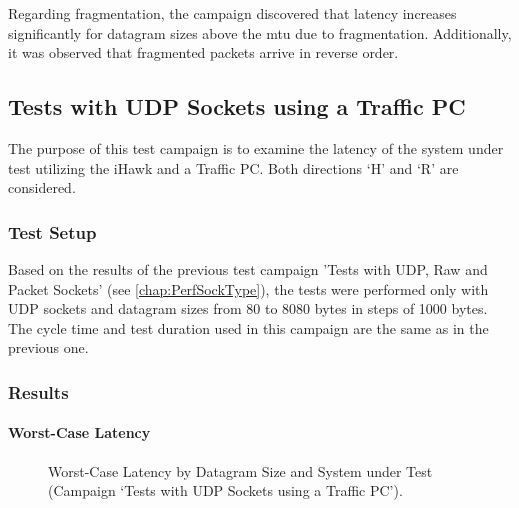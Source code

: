 Regarding fragmentation, the campaign discovered that latency increases significantly for datagram sizes above the \ac{mtu} due to fragmentation. Additionally, it was observed that fragmented packets arrive in reverse order.


\subsection{Tests with UDP Sockets using a Traffic PC}
The purpose of this test campaign is to examine the latency of the system under test utilizing the iHawk and a Traffic PC. Both directions `H' and `R' are considered.

\subsubsection{Test Setup}
Based on the results of the previous test campaign 'Tests with UDP, Raw and Packet Sockets' (see \ref{chap:PerfSockType}), the tests were performed only with UDP sockets and datagram sizes from 80 to 8080 bytes in steps of 1000 bytes. The cycle time and test duration used in this campaign are the same as in the previous one.

\subsubsection{Results}
\paragraph{Worst-Case Latency}

\begin{figure}[h!]
  \centering
  \caption{Worst-Case Latency by Datagram Size and System under Test (Campaign `Tests with UDP Sockets using a Traffic PC').}
  \label{fig:TrafficWc}
\end{figure}

